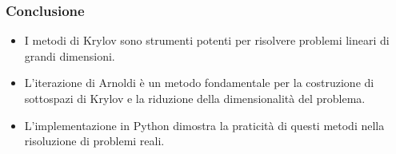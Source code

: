 \documentclass{beamer}
\begin{document}
\begin{frame}
\frametitle{Conclusione}
\begin{itemize}
\item I metodi di Krylov sono strumenti potenti per risolvere problemi lineari di grandi dimensioni.
\item L'iterazione di Arnoldi è un metodo fondamentale per la costruzione di sottospazi di Krylov e la riduzione della dimensionalità del problema.
\item L'implementazione in Python dimostra la praticità di questi metodi nella risoluzione di problemi reali.
\end{itemize}
\end{frame}
\end{document}
